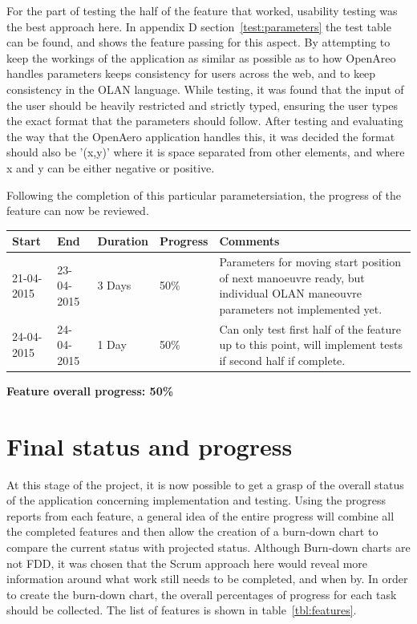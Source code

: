 For the part of testing the half of the feature that worked, usability testing was the best approach here. In appendix D section~\ref{test:parameters} the test table can be found, and shows the feature passing for this aspect. By attempting to keep the workings of the application as similar as possible as to how OpenAreo handles parameters keeps consistency for users across the web, and to keep consistency in the OLAN language. While testing, it was found that the input of the user should be heavily restricted and strictly typed, ensuring the user types the exact format that the parameters should follow. After testing and evaluating the way that the OpenAero application handles this, it was decided the format should also be '(x,y)' where it is space separated from other elements, and where x and y can be either negative or positive.

Following the completion of this particular parametersiation, the progress of the feature can now be reviewed.

\begin{table}[h]
\begin{tabular}{|l|l|l|l|p{7cm}|}
\hline
\textbf{Start} & \textbf{End} & \textbf{Duration} & \textbf{Progress} & \textbf{Comments}                                                                                                     \\ \hline
21-04-2015     & 23-04-2015   & 3 Days            & 50\%             &  Parameters for moving start position of next manoeuvre ready, but individual OLAN maneouvre parameters not implemented yet.\\ \hline
24-04-2015     & 24-04-2015   & 1 Day            & 50\%             &  Can only test first half of the feature up to this point, will implement tests if second half if complete.\\ \hline
\end{tabular}
\end{table}

\textbf{Feature overall progress: 50\%}

\clearpage

\section{Final status and progress}
At this stage of the project, it is now possible to get a grasp of the overall status of the application concerning implementation and testing. Using the progress reports from each feature, a general idea of the entire progress will combine all the completed features and then allow the creation of a burn-down chart to compare the current status with projected status. Although Burn-down charts are not FDD, it was chosen that the Scrum approach here would reveal more information around what work still needs to be completed, and when by. In order to create the burn-down chart, the overall percentages of progress for each task should be collected. The list of features is shown in table~\ref{tbl:features}.

